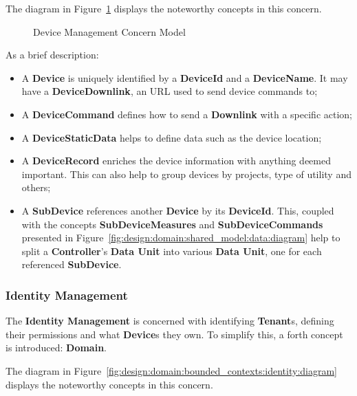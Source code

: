 The diagram in Figure~\ref{fig:design:domain:bounded_contexts:device:diagram} displays the noteworthy concepts in this concern.

\begin{figure}[H]
   \centering
  \resizebox{\columnwidth}{!}
  {
     
  }
  \caption[Device Management Concern Model]{Device Management Concern Model}
  \label{fig:design:domain:bounded_contexts:device:diagram}
\end{figure}

As a brief description:

\begin{itemize}
   \item A \textbf{Device} is uniquely identified by a \textbf{DeviceId} and a \textbf{DeviceName}. It may have a \textbf{DeviceDownlink}, an URL used to send device commands to;
   \item A \textbf{DeviceCommand} defines how to send a \textbf{Downlink} with a specific action;
   \item A \textbf{DeviceStaticData} helps to define data such as the device location;
   \item A \textbf{DeviceRecord} enriches the device information with anything deemed important. This can also help to group devices by projects, type of utility and others;
   \item A \textbf{SubDevice} references another \textbf{Device} by its \textbf{DeviceId}. This, coupled with the concepts \textbf{SubDeviceMeasures} and \textbf{SubDeviceCommands} presented in Figure~\ref{fig:design:domain:shared_model:data:diagram} help to split a \textbf{Controller}'s \textbf{Data Unit} into various \textbf{Data Unit}, one for each referenced \textbf{SubDevice}.
\end{itemize}

\subsubsection{Identity Management}
\label{subsubsec:design:domain:bounded_contexts:identity}

The \textbf{Identity Management} is concerned with identifying \textbf{Tenant}s, defining their permissions and what \textbf{Device}s they own.
To simplify this, a forth concept is introduced: \textbf{Domain}.

The diagram in Figure~\ref{fig:design:domain:bounded_contexts:identity:diagram} displays the noteworthy concepts in this concern.

